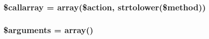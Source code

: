 \subsubsection[{\$callarray}]{\setlength{\rightskip}{0pt plus 5cm}\$callarray = array(\$action, strtolower(\$method))}\label{a00082_a0a2d1b1b87dbb189b9243f333ad904f3}
\hypertarget{a00082_a61eded163d962fc248b3cf209000979b}{}
\subsubsection[{\$arguments}]{\setlength{\rightskip}{0pt plus 5cm}\$arguments = array()}\label{a00082_a61eded163d962fc248b3cf209000979b}
